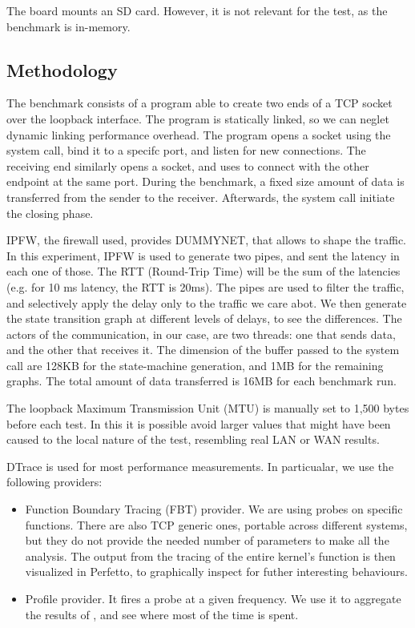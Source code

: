 \documentclass[a4paper,10pt]{article}
\begin{document}
The board mounts an SD card. However, it is not relevant for the test, as the benchmark is in-memory.
      

\subsection {Methodology}

The benchmark consists of a program able to create two ends of a TCP socket over the loopback interface. The program is statically linked, so we can neglet dynamic linking performance overhead. The program opens a socket using the  system call, bind it to a specifc port, and listen for new connections. The receiving end similarly opens a socket, and uses  to connect with the other endpoint at the same port. During the benchmark, a fixed size amount of data is transferred from the sender to the receiver. Afterwards, the  system call initiate the closing phase.

IPFW, the firewall used, provides DUMMYNET\cite{luigirizzo_luigirizzodummynet_2020}, that allows to shape the traffic. In this experiment, IPFW is used to generate two pipes, and sent the latency in each one of those. The RTT (Round-Trip Time) will be the sum of the latencies (e.g. for 10 ms latency, the RTT is 20ms). The pipes are used to filter the traffic, and selectively apply the delay only to the traffic we care abot. We then generate the state transition graph at different levels of delays, to see the differences.
The actors of the communication, in our case, are two threads: one that sends data, and the other that receives it. The dimension of the buffer passed to the  system call are 128KB for the state-machine generation, and 1MB for the remaining graphs.
The total amount of data transferred is 16MB for each benchmark run.

The loopback Maximum Transmission Unit (MTU) is manually set to 1,500 bytes before each test. In this it is possible avoid larger values that might have been caused to the local nature of the test, resembling real LAN or WAN results.

DTrace is used for most performance measurements. In particualar, we use the following providers:

\begin{itemize}
   \item Function Boundary Tracing (FBT) provider. We are using probes on specific functions. There are also TCP generic ones, portable across different systems, but they do not provide the needed number of parameters to make all the analysis. The output from the tracing of the entire kernel's function is then visualized in Perfetto\cite{noauthor_perfetto_nodate}, to graphically inspect for futher interesting behaviours.
   \item Profile provider. It fires a probe at a given frequency. We use it to aggregate the results of , and see where most of the time is spent. 
\end{itemize}
\end{document}
